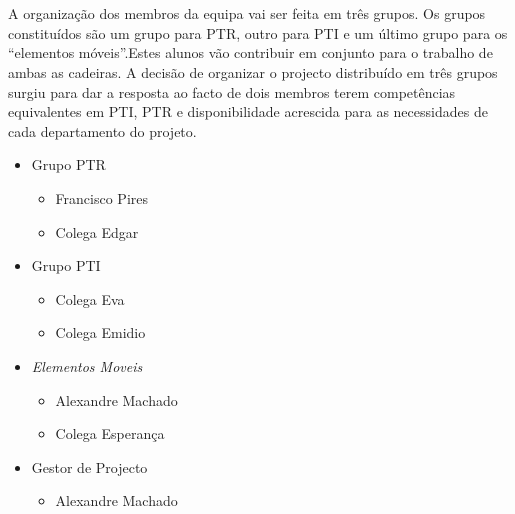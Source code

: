 \documentclass[12pt, a4paper, twoside]{report} %
\begin{document}

\clearpage


\\
\\
A organização dos membros da equipa vai ser feita em três grupos. Os grupos constituídos são um grupo para PTR, outro para PTI e um último grupo para os “elementos móveis”.Estes alunos vão contribuir em conjunto para o trabalho de ambas as cadeiras. A decisão de organizar o projecto distribuído em três grupos surgiu para dar a resposta ao facto de dois membros terem competências equivalentes em PTI, PTR e disponibilidade acrescida para as necessidades de cada departamento do projeto.

\begin{itemize}
\item Grupo PTR
\begin{itemize}
	\item Francisco Pires
	\item Colega Edgar
\end{itemize}
\item Grupo PTI
\begin{itemize}
	\item Colega Eva
	\item Colega Emidio
\end{itemize}
\item \textit{Elementos Moveis}
\begin{itemize}
	\item Alexandre Machado
	\item Colega Esperança
\end{itemize}
\item Gestor de Projecto
\begin{itemize}
	\item Alexandre Machado
\end{itemize}
\end{itemize}
\end{document}
